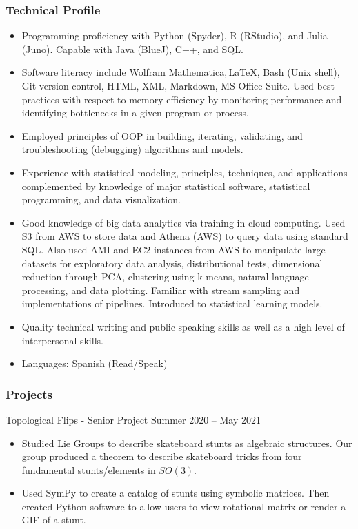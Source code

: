 \documentclass[letterpaper, 10 pt]{article}
\begin{document}
\subsubsection*{Technical Profile}
\begin{itemize}
\setlength\itemsep{0.15 em}
\item Programming proficiency with Python (Spyder), R (RStudio), and Julia (Juno). Capable with Java (BlueJ), C++, and SQL.
\item Software literacy include Wolfram Mathematica,\,\LaTeX, Bash (Unix shell), Git version control, HTML, XML, Markdown, MS Office Suite. Used best practices with respect to memory efficiency by monitoring performance and identifying bottlenecks in a given program or process.
\item Employed principles of OOP in building, iterating, validating, and troubleshooting (debugging) algorithms and models.
\item Experience with statistical modeling, principles, techniques, and applications complemented by knowledge of major statistical software, statistical programming, and data visualization.
\item Good knowledge of big data analytics via training in cloud computing. Used S3 from AWS to store data and Athena (AWS) to query data using standard SQL. Also used AMI and EC2 instances from AWS to manipulate large datasets for exploratory data analysis, distributional tests, dimensional reduction through PCA, clustering using k-means, natural language processing, and data plotting. Familiar with stream sampling and implementations of pipelines. Introduced to statistical learning models.
\item Quality technical writing and public speaking skills as well as a high level of interpersonal skills.
\item Languages: Spanish (Read/Speak)
\end{itemize}

\subsubsection*{Projects}
\centerline{Topological Flips - Senior Project \hfill Summer 2020 – May 2021}
\begin{itemize}
\setlength\itemsep{0.15 em}
\item Studied Lie Groups to describe skateboard stunts as algebraic structures. Our group produced a theorem to describe skateboard tricks from four fundamental stunts/elements in $SO(3)$.
\item Used SymPy to create a catalog of stunts using symbolic matrices. Then created Python software to allow users to view rotational matrix or render a GIF of a stunt.
\end{itemize}
\end{document}
